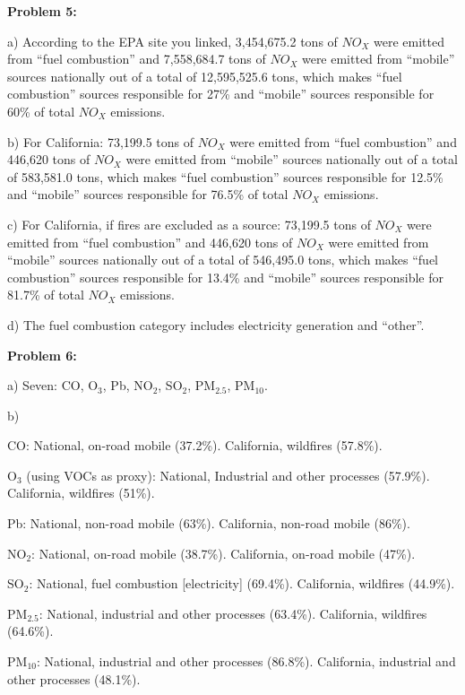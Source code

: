 \documentclass[10pt]{article}
\begin{document}
\begin{flushleft}
        \hrulefill

        \textbf{Problem 5:}

        a)
        According to the EPA site you linked, 3,454,675.2 tons of $NO_X$ were emitted from ``fuel combustion'' and 7,558,684.7 tons of $NO_X$ were emitted from ``mobile'' sources nationally out of a total of 12,595,525.6 tons, which makes ``fuel combustion'' sources responsible for 27\% and ``mobile'' sources responsible for 60\% of total $NO_X$ emissions.  

        b) For California: 73,199.5 tons of $NO_X$ were emitted from ``fuel combustion'' and 446,620 tons of $NO_X$ were emitted from ``mobile'' sources nationally out of a total of 583,581.0 tons, which makes ``fuel combustion'' sources responsible for 12.5\% and ``mobile'' sources responsible for 76.5\% of total $NO_X$ emissions. 

        c) For California, if fires are excluded as a source: 73,199.5 tons of $NO_X$ were emitted from ``fuel combustion'' and 446,620 tons of $NO_X$ were emitted from ``mobile'' sources nationally out of a total of 546,495.0 tons, which makes ``fuel combustion'' sources responsible for 13.4\% and ``mobile'' sources responsible for 81.7\% of total $NO_X$ emissions.
        
        d) The fuel combustion category includes electricity generation and ``other''.
        
        \hrulefill

        \textbf{Problem 6:}

        a) Seven: CO, O$_3$, Pb, NO$_2$, SO$_2$, PM$_{2.5}$, PM$_{10}$.

        b) 
        
        CO: National, on-road mobile (37.2\%). California, wildfires (57.8\%).

        O$_3$ (using VOCs as proxy): National, Industrial and other processes (57.9\%). California, wildfires (51\%).

        Pb: National, non-road mobile (63\%). California, non-road mobile (86\%).

        NO$_2$: National, on-road mobile (38.7\%). California, on-road mobile (47\%).

        SO$_2$: National, fuel combustion [electricity] (69.4\%). California, wildfires (44.9\%).

        PM$_{2.5}$: National, industrial and other processes (63.4\%). California, wildfires (64.6\%).

        PM$_{10}$: National, industrial and other processes (86.8\%). California, industrial and other processes (48.1\%).


\end{flushleft}
\end{document}
